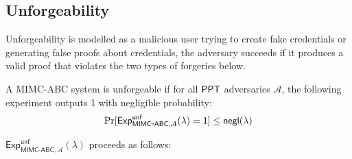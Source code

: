 \newpage
\subsection{Unforgeability}
Unforgeability is modelled as a malicious user trying to create fake credentials or generating false proofs about credentials, the adversary succeeds if it produces a valid proof that violates the two types of forgeries below.
\begin{definition}[Unforgeability]
A MIMC-ABC system is unforgeable if for all $\mathsf{PPT}$ adversaries $\mathcal{A}$, the following experiment outputs 1 with negligible probability:
\[
\Pr[\mathsf{Exp}^{\mathsf{unf}}_{\mathsf{MIMC\mbox{-}ABC},\mathcal{A}}(\lambda) = 1] \leq {\mathsf{negl}(\lambda)}
\]
\end{definition}

\noindent $\mathsf{Exp}^{\mathsf{unf}}_{\mathsf{MIMC\mbox{-}ABC},\mathcal{A}}(\lambda)$ proceeds as follows:

